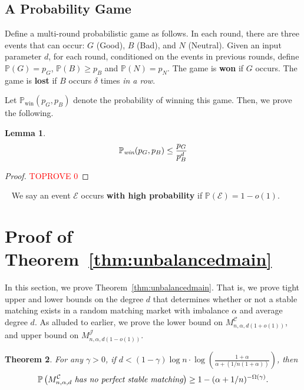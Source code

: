 \documentclass[11pt]{amsart}
\newtheorem{theorem}{Theorem}
\newtheorem{lemma}[theorem]{Lemma}
\newcommand{\pparagraph}[1]{
\vspace{0.13in}\noindent{\textbf{\boldmath #1}}~}
\newcommand{\cal}[1]{\mathcal{#1}}
\renewcommand{\Pr}{\mathbb{P}}
\newcommand{\defn}{\textbf}
\begin{document}
\subsection{A Probability Game}
\label{sec:game}

Define a multi-round probabilistic game as follows. In each round, there are three events that can occur: $G$ (Good), $B$ (Bad), and $N$ (Neutral).  Given an input parameter $d$,  for each round, conditioned on the events in previous rounds, define
$\Pr(G) = p_G$, $\Pr(B) \geq p_B$ and $\Pr(N) = p_N$.  The game is \defn{won} if $G$ occurs.  The game is \defn{lost} if $B$ occurs $\delta$ times \emph{in a row}.  

Let $\Pr_{\text{win}}(p_G, p_B)$ denote the probability of winning this game.  Then, we prove the following.

\begin{lemma}\label{lem:probgame}
\begin{equation*}
  \Pr_{\text{\em win}}(p_G, p_B) 
\leq \frac{p_G}{p_B^d}
\end{equation*}
\end{lemma}

\begin{proof}\textcolor{red}{TOPROVE 0}\end{proof}

\pparagraph{Notation.}  
We say an event $\mathcal{E}$ occurs \defn{with high probability} if $\mathbb{P}(\mathcal{E}) = 1-o(1)$. 

 \section{Proof of Theorem~\ref{thm:unbalancedmain}}\label{sec:threshold}
In this section, we prove Theorem~\ref{thm:unbalancedmain}.  That is, we prove tight upper and lower bounds on the degree $d$ that determines whether or not a stable matching exists in a random matching market with imbalance $\alpha$ and average degree $d$. As alluded to earlier, we prove the lower bound on $M_{n,\alpha,d(1+o(1))}^{\mathcal{C}}$, and upper bound on $M_{n,\alpha,d(1-o(1))}^{\mathcal{J}}$.



\begin{theorem}\label{thm:threshlower}
For any $\gamma>0$, if $d < (1-\gamma) \log n \cdot \log \left( \frac {1 + \alpha}{\alpha + (1/n(1+\alpha))} \right)$, then 
\[
\mathbb{P}\left(M_{n, \alpha, d}^{\cal{C}}~\emph{has no perfect stable matching}\right) \geq 1 - (\alpha + 1/n)^{-\Omega(\gamma)}.
\]
\end{theorem}
\end{document}
